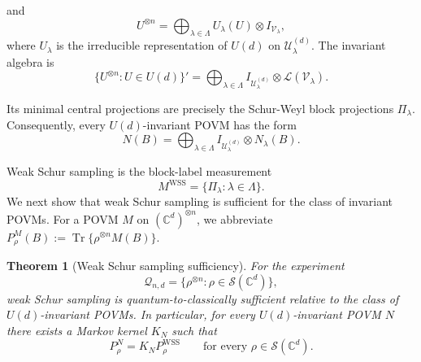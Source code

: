 \documentclass{article}
\newtheorem{theorem}{Theorem}[section]
\theoremstyle{named}
\theoremstyle{named1}
\newcommand{\bbC}{\mathbb C}
\newcommand{\cQ}{\mathcal Q}
\newcommand{\cU}{\mathcal U}
\newcommand{\cV}{\mathcal V}
\theoremstyle{plain}
\theoremstyle{remark}
\begin{document}
and
\[
    U^{\otimes n}
    =
    \bigoplus_{\lambda\in\Lambda}
    U_\lambda(U)\otimes I_{\cV_\lambda},
\]
where $U_\lambda$ is the irreducible representation of $U(d)$ on
$\cU_\lambda^{(d)}$.
 The invariant algebra is
\[
    \{U^{\otimes n}:U\in U(d)\}'
    =
    \bigoplus_{\lambda\in\Lambda}
    I_{\cU_\lambda^{(d)}}\otimes\mathcal L(\cV_\lambda).
\]

Its minimal central projections are precisely the Schur-Weyl block projections
$\Pi_\lambda$. Consequently, every $U(d)$-invariant POVM has the form
\[
    N(B)
    =
    \bigoplus_{\lambda\in\Lambda}
    I_{\cU_\lambda^{(d)}}\otimes N_\lambda(B).
\]



Weak Schur sampling is the block-label measurement
\[
    M^{\mathrm{WSS}}
    =
    \{\Pi_\lambda:\lambda\in\Lambda\}.
\]
We next show that weak
Schur sampling is sufficient for the class of invariant POVMs.
For a POVM $M$ on $(\mathbb C^d)^{\otimes n}$, we abbreviate
$P_\rho^M(B):=\operatorname{Tr}\{\rho^{\otimes n}M(B)\}$.

\begin{theorem}[Weak Schur sampling sufficiency]
\label{thm:wss}
For the experiment
\[
    \cQ_{n,d}
    =
    \{\rho^{\otimes n}:
      \rho\in\mathcal S(\bbC^d)\},
\]
weak Schur sampling is quantum-to-classically sufficient relative to the class
of $U(d)$-invariant POVMs. In particular, for every $U(d)$-invariant POVM
$N$ there exists a Markov kernel $K_N$ such that
\[
    P_\rho^N
    =
    K_NP_\rho^{\mathrm{WSS}}
    \qquad
    \text{for every }\rho\in\mathcal S(\bbC^d).
\]
\end{theorem}
\end{document}
